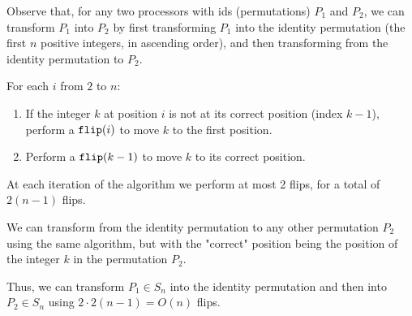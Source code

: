 \documentclass{article}
\begin{document}
Observe that, for any two processors with ids (permutations) $P_1$ and $P_2$, we can transform $P_1$ into $P_2$ by first transforming $P_1$ into the identity permutation (the first $n$ positive integers, in ascending order), and then transforming from the identity permutation to $P_2$.

For each $i$ from $2$ to $n$:
\begin{enumerate}
  \item If the integer $k$ at position $i$ is not at its correct position (index $k-1$), perform a $\verb|flip|(i)$ to move $k$ to the first position.
  \item Perform a $\verb|flip|(k-1)$ to move $k$ to its correct position.
\end{enumerate}

At each iteration of the algorithm we perform at most 2 flips, for a total of $2(n-1)$ flips.

We can transform from the identity permutation to any other permutation $P_2$ using the same algorithm, but with the "correct" position being the position of the integer $k$ in the permutation $P_2$.

Thus, we can transform $P_1 \in S_n$ into the identity permutation and then into $P_2 \in S_n$ using $2\cdot 2(n-1) = O(n)$ flips.
\end{document}
